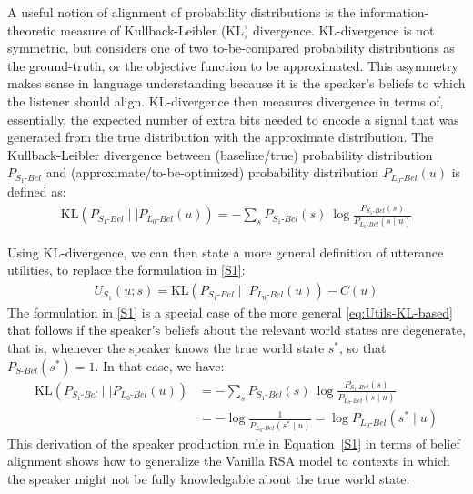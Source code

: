 \documentclass[10pt,letterpaper]{article}
\begin{document}
A useful notion of alignment of probability distributions is the information-theoretic
measure of Kullback-Leibler (KL) divergence. KL-divergence is not symmetric, but considers one of
two to-be-compared probability distributions as the ground-truth, or the objective function
to be approximated.
This asymmetry makes sense in language understanding because it is the speaker's
beliefs to which the listener should align. KL-divergence then measures divergence in terms of,
essentially, the expected number of extra bits needed to encode a signal that was generated
from the true distribution with the approximate distribution.
The Kullback-Leibler divergence between (baseline/true) probability distribution
$P_{S_{1}\text{-}Bel}$ and (approximate/to-be-optimized) probability distribution
$P_{L_{0}\text{-}Bel}(u)$ is defined as:
\begin{align}
  \label{eq:KL-divergence}
  \text{KL}(P_{S_{1}\text{-}Bel} \mid \mid P_{L_{0}\text{-}Bel}(u)) = - \sum_{s} P_{S_{1}\text{-}Bel}(s) \ \log \frac{P_{S_{1}\text{-}Bel}(s)}{P_{L_{0}\text{-}Bel}(s \mid u)}
\end{align}

Using KL-divergence, we can then state a more general definition of utterance utilities, to
replace the formulation in \eqref{S1}:
\begin{align}
  \label{eq:Utils-KL-based}
  U_{S_1}(u; s) = \text{KL}(P_{S_{1}\text{-}Bel} \mid \mid P_{L_{0}\text{-}Bel}(u)) - C(u)
\end{align}
The formulation in \eqref{S1} is a special case of the more general \eqref{eq:Utils-KL-based}
that follows if the speaker's beliefs about the relevant world states are degenerate, that is,
whenever the speaker knows the true world state $s^{*}$, so that $P_{S\text{-}Bel}(s^{*})=1$.
In that case, we have:
\begin{align*}
  \text{KL}(P_{S_{1}\text{-}Bel} \mid \mid P_{L_{0}\text{-}Bel}(u)) & = - \sum_{s} P_{S_{1}\text{-}Bel}(s) \ \log \frac{P_{S_{1}\text{-}Bel}(s)}{P_{L_{0}\text{-}Bel}(s \mid u)} \\
  & =  - \log\frac{1}{P_{L_{0}\text{-}Bel}(s^* \mid u)} = \log P_{L_{0}\text{-}Bel}(s^* \mid u)
\end{align*}
This derivation of the speaker production rule in Equation~\eqref{S1} in terms of belief alignment shows how to generalize the Vanilla RSA model to contexts in which the speaker might not be fully knowledgable about the true world state. %
\end{document}
